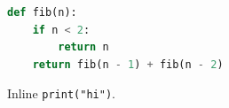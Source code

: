\documentclass{article}
\begin{document}
\begin{lstlisting}[language=Python]
def fib(n):
    if n < 2:
        return n
    return fib(n - 1) + fib(n - 2)
\end{lstlisting}
Inline \lstinline|print("hi")|.
\end{document}
